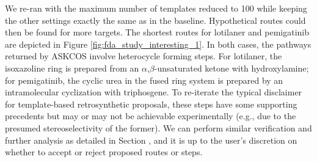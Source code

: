 \documentclass[pdflatex,sn-mathphys-num]{sn-jnl}%
\theoremstyle{thmstyleone}%
\theoremstyle{thmstyletwo}%
\theoremstyle{thmstylethree}%
\begin{document}
We re-ran with the maximum number of templates reduced to 100 while keeping the other settings exactly the same as in the baseline. Hypothetical routes could then be found for more targets. The shortest routes for lotilaner and pemigatinib are depicted in Figure \ref{fig:fda_study_interesting_1}. In both cases, the pathways returned by ASKCOS involve heterocycle forming steps. For lotilaner, the isoxazoline ring is prepared from an $\alpha$,$\beta$-unsaturated ketone with hydroxylamine; for pemigatinib, the cyclic urea in the fused ring system is prepared by an intramolecular cyclization with triphosgene. To re-iterate the typical disclaimer for template-based retrosynthetic proposals, these steps have some supporting precedents but may or may not be achievable experimentally  (e.g., due to the presumed stereoselectivity of the former). We can perform similar verification and further analysis as detailed in Section , and it is up to the user's discretion on whether to accept or reject proposed routes or steps.
\end{document}
